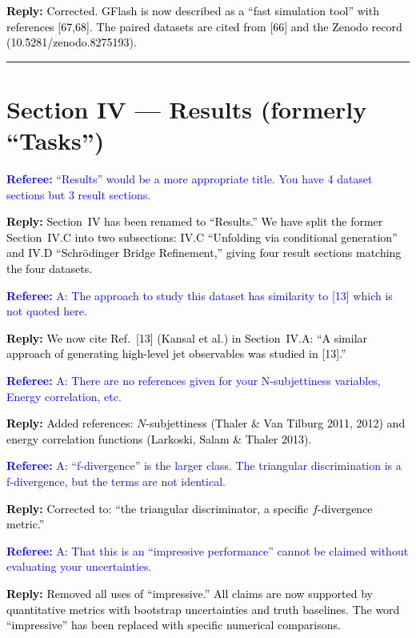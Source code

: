 \documentclass[11pt]{article}
\newcommand{\refcomment}[1]{\textcolor{blue}{\textbf{Referee:} #1}}
\newcommand{\reply}[1]{\textcolor{black}{\textbf{Reply:} #1}}
\begin{document}
\reply{Corrected. GFlash is now described as a ``fast simulation tool'' with references [67,68]. The paired datasets are cited from [66] and the Zenodo record (10.5281/zenodo.8275193).}

\bigskip
\hrule
\bigskip

\section*{Section IV --- Results (formerly ``Tasks'')}

\refcomment{``Results'' would be a more appropriate title. You have 4 dataset sections but 3 result sections.}

\reply{Section~IV has been renamed to ``Results.'' We have split the former Section~IV.C into two subsections: IV.C ``Unfolding via conditional generation'' and IV.D ``Schr\"odinger Bridge Refinement,'' giving four result sections matching the four datasets.}

\bigskip

\refcomment{A: The approach to study this dataset has similarity to [13] which is not quoted here.}

\reply{We now cite Ref.~[13] (Kansal et al.) in Section~IV.A: ``A similar approach of generating high-level jet observables was studied in [13].''}

\bigskip

\refcomment{A: There are no references given for your N-subjettiness variables, Energy correlation, etc.}

\reply{Added references: $N$-subjettiness (Thaler \& Van Tilburg 2011, 2012) and energy correlation functions (Larkoski, Salam \& Thaler 2013).}

\bigskip

\refcomment{A: ``f-divergence'' is the larger class. The triangular discrimination is a f-divergence, but the terms are not identical.}

\reply{Corrected to: ``the triangular discriminator, a specific $f$-divergence metric.''}

\bigskip

\refcomment{A: That this is an ``impressive performance'' cannot be claimed without evaluating your uncertainties.}

\reply{Removed all uses of ``impressive.'' All claims are now supported by quantitative metrics with bootstrap uncertainties and truth baselines. The word ``impressive'' has been replaced with specific numerical comparisons.}

\bigskip
\end{document}
